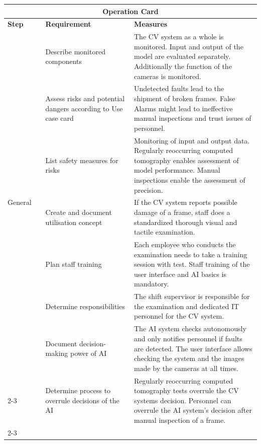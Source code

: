 \newpage
{\small
\renewcommand\arraystretch{1.3}
\begin{longtable}{p{0.15\linewidth}|p{0.35\linewidth}p{0.5\linewidth}}
    \toprule
    \multicolumn{3}{c}{\bf{Operation Card}}\\
    \toprule
    \bf{Step}   & \bf{Requirement}   &  \bf{Measures} \\
    \hline
    \hline
    \multirow{7}{=}{General} 
    Scope and aim of monitoring     
        & Describe monitored components & The CV system as a whole is monitored. Input and output of the model are evaluated separately. Additionally the function of the cameras is monitored.\\\cline{2-3}
        & Assess risks and potential dangers according to Use case card & Undetected faults lead to the shipment of broken frames. False Alarms might lead to ineffective manual inspections and trust issues of personnel.\\\cline{2-3}
        & List safety measures for risks & Monitoring of input and output data. Regularly reoccurring computed tomography enables assessment of model performance. Manual inspections enable the assessment of precision.\\\cline{2-3}
                                    
    \hline
    Operating concept               
        & Create and document utilisation concept & If the CV system reports possible damage of a frame, staff does a standardized thorough visual and tactile examination.\\\cline{2-3}
        & Plan staff training & Each employee who conducts the examination needs to take a training session with test. Staff training of the user interface and AI basics is mandatory. \\\cline{2-3}
        & Determine responsibilities & The shift supervisor is responsible for the examination and dedicated IT  personnel for the CV system.\\\cline{2-3}
        
    \hline
    Autonomy of the application     
        & Document decision-making power of AI  & The AI system checks autonomously and only notifies personnel if faults are detected. The user interface allows checking the system and the images made by the cameras at all times. \\\cline{2-3}
        & Determine process to overrule decisions of the AI & Regularly reoccurring computed tomography tests overrule the CV systems decision. Personnel can overrule the AI system's decision after manual inspection of a frame.\\\cline{2-3}
    

\end{longtable}}
